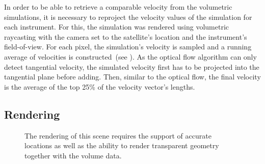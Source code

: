 In order to be able to retrieve a comparable velocity from the volumetric simulations, it is necessary to reproject the velocity values of the simulation for each instrument.  For this, the simulation was rendered using volumetric raycasting with the camera set to the satellite's location and the instrument's field-of-view.  For each pixel, the simulation's velocity is sampled and a running average of velocities is constructed~(see ).  As the optical flow algorithm can only detect tangential velocity, the simulated velocity first has to be projected into the tangential plane before adding.  Then, similar to the optical flow, the final velocity is the average of the top 25\% of the velocity vector's lengths.


\subsection{Rendering} \label{contributions:astro:spaceweather:rendering}
\begin{figure}
\centering
{}
\caption{The rendering of this scene requires the support of accurate locations as well as the ability to render transparent geometry together with the volume data.}
\label{contributions:astro:spaceweather:rendering:rendering}
\end{figure}

